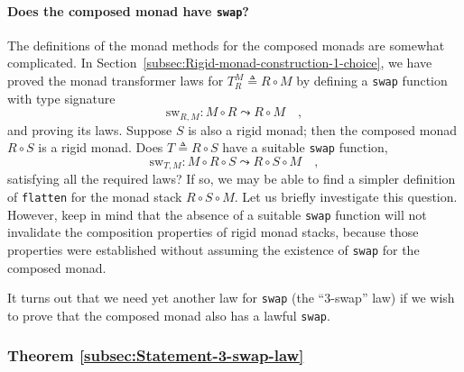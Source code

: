 \paragraph{Does the composed monad have \lstinline!swap!? }

The definitions of the monad methods for the composed monads are somewhat
complicated. In Section~\ref{subsec:Rigid-monad-construction-1-choice},
we have proved the monad transformer laws for $T_{R}^{M}\triangleq R\circ M$
by defining a \lstinline!swap!
function with type signature
\[
\text{sw}_{R,M}:M\circ R\leadsto R\circ M\quad,
\]
and proving its laws. Suppose $S$ is also a rigid monad; then the
composed monad $R\circ S$ is a rigid monad. Does $T\triangleq R\circ S$
have a suitable \lstinline!swap!
function,
\[
\text{sw}_{T,M}:M\circ R\circ S\leadsto R\circ S\circ M\quad,
\]
satisfying all the required laws? If so, we may be able to find a
simpler definition of \lstinline!flatten!
for the monad stack $R\circ S\circ M$. Let us briefly investigate
this question. However, keep in mind that the absence of a suitable
\lstinline!swap! function
will not invalidate the composition properties of rigid monad stacks,
because those properties were established without assuming the existence
of \lstinline!swap! for
the composed monad.

It turns out that we need yet another law for \lstinline!swap!
(the ``3-swap'' law) if we wish to prove that the composed monad
also has a lawful \lstinline!swap!. 

\subsubsection{Theorem \label{subsec:Statement-3-swap-law}\ref{subsec:Statement-3-swap-law}}

